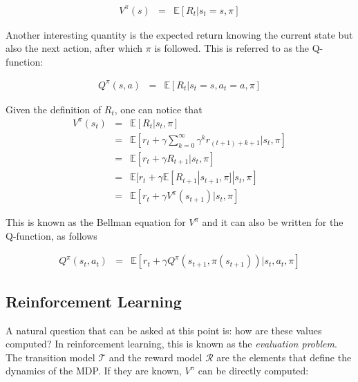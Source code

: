 				\begin{eqnarray}
					V^{\pi} (s) & = & \mathbb{E} [R_t | s_t=s, \pi] \label{eq:valuefunc}
				\end{eqnarray}
					
			Another interesting quantity is the expected return knowing the current state but also the next action, after which $\pi$ is followed. This is referred to as the Q-function:
				
				\begin{eqnarray}
					Q^{\pi} (s,a) & = & \mathbb{E} [R_t | s_t=s, a_t=a, \pi] \label{eq:qfunc}
				\end{eqnarray}
					
			Given the definition of $R_t$, one can notice that 
			\begin{eqnarray}
					V^{\pi} (s_t)   & = & \mathbb{E} [R_t | s_t, \pi] \nonumber \\
					& = & \mathbb{E} [r_t + \gamma \sum_{k=0}^\infty \gamma^k r_{(t+1)+k+1} | s_t, \pi] \nonumber \\
					& = & \mathbb{E} [r_t + \gamma R_{t+1} | s_t, \pi] \nonumber \\
					& = & \mathbb{E} [r_t + \gamma \mathbb{E} [R_{t+1}|s_{t+1}, \pi] | s_t, \pi] \nonumber \\
					& = & \mathbb{E} [r_t + \gamma V^{\pi} (s_{t+1}) | s_t, \pi] \label{eq:vbellman}
			\end{eqnarray}
					
		This is known as the Bellman equation for $V^{\pi}$ and it can also be written for the Q-function, as follows
				
				\begin{eqnarray}
					Q^{\pi} (s_t,a_t) & = & \mathbb{E} [r_t + \gamma Q^{\pi} (s_{t+1}, \pi(s_{t+1})) | s_t, a_t, \pi] \label{eq:qbellman}
				\end{eqnarray}
	
	\subsection{Reinforcement Learning}
            
			A natural question that can be asked at this point is: how are these values computed? In reinforcement learning, this is known as the \textit{evaluation problem}. The transition model $\mathscr{T}$ and the reward model $\mathscr{R}$ are the elements that define the dynamics of the MDP. If they are known, $V^{\pi}$ can be directly computed:
			
